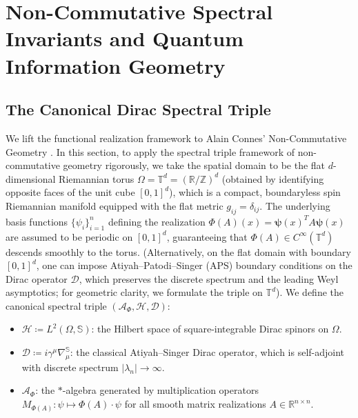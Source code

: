\documentclass[11pt,a4paper,reqno]{amsart}
\theoremstyle{definition}
\numberwithin{equation}{section}
\newcommand{\R}{\mathbb{R}}
\begin{document}
\section{Non-Commutative Spectral Invariants and Quantum Information Geometry}
\label{sec:noncommutative}

\subsection{The Canonical Dirac Spectral Triple}
We lift the functional realization framework to Alain Connes' Non-Commutative Geometry \cite{connes1994noncommutative}.
In this section, to apply the spectral triple framework of non-commutative geometry rigorously, we take the spatial domain to be the flat $d$-dimensional Riemannian torus $\Omega = \mathbb{T}^d = (\mathbb{R}/\mathbb{Z})^d$ (obtained by identifying opposite faces of the unit cube $[0,1]^d$), which is a compact, boundaryless spin Riemannian manifold equipped with the flat metric $g_{ij} = \delta_{ij}$. The underlying basis functions $\{\psi_i\}_{i=1}^n$ defining the realization $\Phi(A)(x) = \boldsymbol{\psi}(x)^T A \boldsymbol{\psi}(x)$ are assumed to be periodic on $[0, 1]^d$, guaranteeing that $\Phi(A) \in C^\infty(\mathbb{T}^d)$ descends smoothly to the torus. (Alternatively, on the flat domain with boundary $[0,1]^d$, one can impose Atiyah--Patodi--Singer (APS) boundary conditions on the Dirac operator $\mathcal{D}$, which preserves the discrete spectrum and the leading Weyl asymptotics; for geometric clarity, we formulate the triple on $\mathbb{T}^d$). We define the canonical spectral triple $(\mathcal{A}_\Phi, \mathcal{H}, \mathcal{D})$:
\begin{itemize}
    \item $\mathcal{H} \coloneqq L^2(\Omega, \mathbb{S})$: the Hilbert space of square-integrable Dirac spinors on $\Omega$.
    \item $\mathcal{D} \coloneqq i \gamma^\mu \nabla_\mu^\mathbb{S}$: the classical Atiyah--Singer Dirac operator, which is self-adjoint with discrete spectrum $|\lambda_n| \to \infty$.
    \item $\mathcal{A}_\Phi$: the $*$-algebra generated by multiplication operators $M_{\Phi(A)} \colon \psi \mapsto \Phi(A) \cdot \psi$ for all smooth matrix realizations $A \in \R^{n \times n}$.
\end{itemize}
\end{document}
